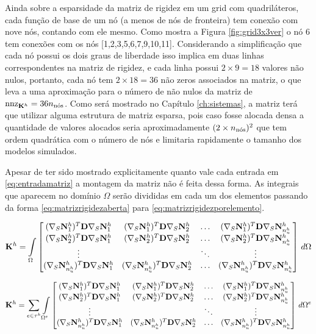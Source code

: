 Ainda sobre a esparsidade da matriz de rigidez em um grid com quadriláteros, cada função de base de um nó (a menos de nós de fronteira) tem conexão com nove nós, contando com ele mesmo. Como mostra a Figura \ref{fig:grid3x3ver} o nó 6 tem conexões com os nós [1,2,3,5,6,7,9,10,11]. Considerando a simplificação que cada nó possui os dois graus de liberdade isso implica em duas linhas correspondentes na matriz de rigidez, e cada linha possui $2 \times 9 = 18$ valores não nulos, portanto, cada nó tem $2 \times 18 = 36$ não zeros associados na matriz, o que leva a uma aproximação para o número de não nulos da matriz de $\text{nnz}_{\rigidmatrix} = 36 \qtdnos$. Como será mostrado no Capítulo \ref{ch:sistemas}, a matriz terá que utilizar alguma estrutura de matriz esparsa, pois caso fosse alocada densa a quantidade de valores alocados seria aproximadamente $(2 \times \qtdnos)^2$ que tem ordem quadrática com o número de nós e limitaria rapidamente o tamanho dos modelos simulados.


Apesar de ter sido mostrado explicitamente quanto vale cada entrada em \eqref{eq:entradamatriz} a montagem da matriz não é feita dessa forma. As integrais que aparecem no domínio $\Omega$ serão divididas em cada um dos elementos passando da forma \eqref{eq:matrizrigidezaberta} para \eqref{eq:matrizrigidezporelemento}.


\begin{equation}\label{eq:matrizrigidezaberta}
\rigidmatrix  = \omeint{
\begin{bmatrix}
\kij{1}{1} & \kij{1}{2}  & \hdots & \kij{1}{\qtdfreedomfine} \\
\kij{2}{1} & \kij{2}{2}  & \hdots & \kij{2}{\qtdfreedomfine} \\
\vdots &  & \ddots & \vdots\\
\kij{\qtdfreedomfine}{1} & \kij{\qtdfreedomfine}{2}  & \hdots & \kij{\qtdfreedomfine}{\qtdfreedomfine}
\end{bmatrix}
}
\end{equation}


\begin{equation}\label{eq:matrizrigidezporelemento}
\rigidmatrix  = \sum_{e \in \tau^h} \omeeint{
\begin{bmatrix}
\kij{1}{1} & \kij{1}{2}  & \hdots & \kij{1}{\qtdfreedomfine} \\
\kij{2}{1} & \kij{2}{2}  & \hdots & \kij{2}{\qtdfreedomfine} \\
\vdots     &             & \ddots & \vdots\\
\kij{\qtdfreedomfine}{1} & \kij{\qtdfreedomfine}{2}  & \hdots & \kij{\qtdfreedomfine}{\qtdfreedomfine}
\end{bmatrix}
}
\end{equation}


